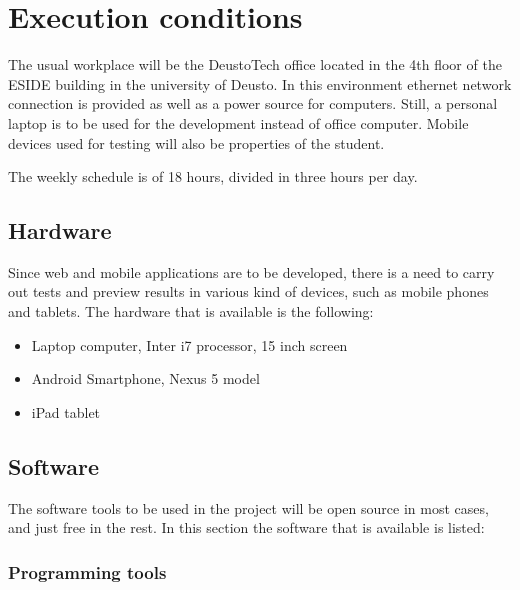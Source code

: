 \section{Execution conditions}

The usual workplace will be the DeustoTech office located in the 4th floor of the ESIDE building in the university of Deusto. In this environment ethernet network connection is provided as well as a power source for computers. Still, a personal laptop is to be used for the development instead of office computer. Mobile devices used for testing will also be properties of the student.

The weekly schedule is of 18 hours, divided in three hours per day. 

\subsection{Hardware}

Since web and mobile applications are to be developed, there is a need to carry out tests and preview results in various kind of devices, such as mobile phones and tablets. The hardware that is available is the following:

\begin{itemize}
\item Laptop computer, Inter i7 processor, 15 inch screen
\item Android Smartphone, Nexus 5 model
\item iPad tablet
\end{itemize}

\subsection{Software}

The software tools to be used in the project will be open source in most cases, and just free in the rest. In this section the software that is available is listed:

\subsubsection*{Programming tools}

